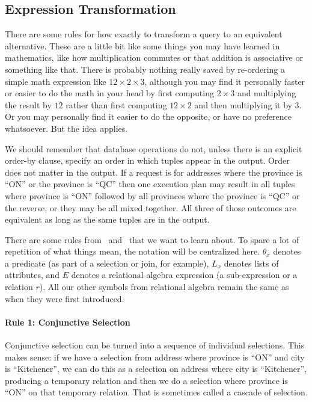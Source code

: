 \subsection*{Expression Transformation}

There are some rules for how exactly to transform a query to an equivalent alternative. These are a little bit like some things you may have learned in mathematics, like how multiplication commutes or that addition is associative or something like that. There is probably nothing really saved by re-ordering a simple math expression like $12 \times 2 \times 3$, although you may find it personally faster or easier to do the math in your head by first computing $2 \times 3$ and multiplying the result by $12$ rather than first computing $12 \times 2$ and then multiplying it by $3$. Or you may personally find it easier to do the opposite, or have no preference whatsoever. But the idea applies.

We should remember that database operations do not, unless there is an explicit order-by clause, specify an order in which tuples appear in the output. Order does not matter in the output. If a request is for addresses where the province is ``ON'' or the province is ``QC'' then one execution plan may result in all tuples where province is ``ON'' followed by all provinces where the province is ``QC'' or the reverse, or they may be all mixed together. All three of those outcomes are equivalent as long as the same tuples are in the output.

There are some rules from~\cite{dsc} and~\cite{fds} that we want to learn about. To spare a lot of repetition of what things mean, the notation will be centralized here. $\theta_{x}$ denotes a predicate (as part of a selection or join, for example), $L_{x}$ denotes lists of attributes, and $E$ denotes a relational algebra expression (a sub-expression or a relation $r$). All our other symbols from relational algebra remain the same as when they were first introduced.

\paragraph{Rule 1: Conjunctive Selection}
Conjunctive selection can be turned into a sequence of individual selections. This makes sense: if we have a selection from address where province is ``ON'' and city is ``Kitchener'', we can do this as a selection on address where city is ``Kitchener'', producing a temporary relation and then we do a selection where province is ``ON'' on that temporary relation. That is sometimes called a cascade of selection.

